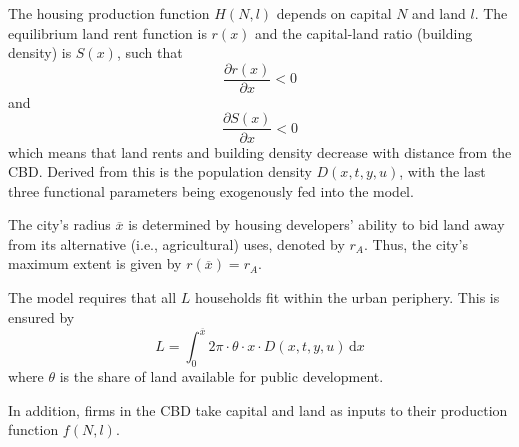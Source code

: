 \documentclass[preprint,2p,12pt]{elsarticle}
\begin{document}
The housing production function $H(N, l)$ depends on capital $N$ and land $l$. The equilibrium land rent function is $r(x)$ and the capital-land ratio (building density) is $S(x)$, such that 
$$\frac{\partial r(x)}{\partial x} < 0$$ 
and 
$$\frac{\partial S(x)}{\partial x} < 0$$
which means that land rents and building density decrease with distance from the CBD. Derived from this is the population density $D(x,t,y,u)$, with the last three functional parameters being exogenously fed into the model.

The city's radius $\overline{x}$ is determined by housing developers' ability to bid land away from its alternative (i.e., agricultural) uses, denoted by $r_A$. Thus, the city's maximum extent is given by $r(\overline{x}) = r_A$.

The model requires that all $L$ households fit within the urban periphery. This is ensured by 
$$L = \int_{0}^{\overline{x}} \! 2 \pi \cdot \theta \cdot x \cdot D(x,t,y,u) \, \mathrm{d}x$$
where $\theta$ is the share of land available for public development.

In addition, firms in the CBD take capital and land as inputs to their production function $f(N,l)$.
\end{document}
